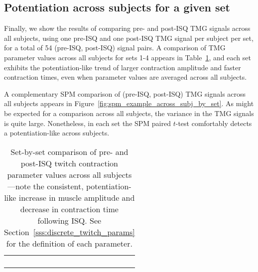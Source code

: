 \documentclass[utf8]{style/FrontiersinHarvard}
\begin{document}
\subsection{Potentiation across subjects for a given set}
Finally, we show the results of comparing pre- and post-ISQ TMG signals across all subjects, using one pre-ISQ and one post-ISQ TMG signal per subject per set, for a total of 54 (pre-ISQ, post-ISQ) signal pairs.
A comparison of TMG parameter values across all subjects for sets 1-4 appears in Table~\ref{tab:tmg_params_across_subj_by_set}, and each set exhibits the potentiation-like trend of larger contraction amplitude and faster contraction times, even when parameter values are averaged across all subjects.

A complementary SPM comparison of (pre-ISQ, post-ISQ) TMG signals across all subjects appears in Figure~\ref{fig:spm_example_across_subj_by_set}.
As might be expected for a comparison across all subjects, the variance in the TMG signals is quite large.
Nonetheless, in each set the SPM paired $ t $-test comfortably detects a potentiation-like across subjects.

\begin{table}[htb!]
    \centering
    \caption{Set-by-set comparison of pre- and post-ISQ twitch contraction parameter values across all subjects---note the consistent, potentiation-like increase in muscle amplitude and decrease in contraction time following ISQ.
    See Section~\ref{sss:discrete_twitch_params} for the definition of each parameter.}
    \vspace{1ex}

    \renewcommand{\arraystretch}{1.2}
    \begin{tabular}{c}
         \hfill \\
         \hfill \\
         \hfill \\
         \hfill \\
    \end{tabular}

    \label{tab:tmg_params_across_subj_by_set}
\end{table}
\end{document}
